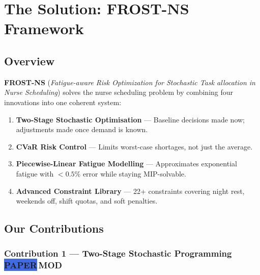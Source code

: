\documentclass[12pt,a4paper]{article}
\newcommand{\modbadge}{\colorbox{accentorange}{\tiny\color{white}\textbf{MOD}}\,}
\newcommand{\frombadge}{\colorbox{royalblue}{\tiny\color{white}\textbf{PAPER}}\,}
\begin{document}
\section{The Solution: FROST-NS Framework}

\subsection{Overview}

\begin{solutionbox}
\textbf{FROST-NS} (\textit{Fatigue-aware Risk Optimization for Stochastic Task allocation in Nurse Scheduling}) solves the nurse scheduling problem by combining four innovations into one coherent system:

\begin{enumerate}[itemsep=4pt]
  \item \textbf{Two-Stage Stochastic Optimisation} — Baseline decisions made now; adjustments made once demand is known.
  \item \textbf{CVaR Risk Control} — Limits worst-case shortages, not just the average.
  \item \textbf{Piecewise-Linear Fatigue Modelling} — Approximates exponential fatigue with \(<0.5\%\) error while staying MIP-solvable.
  \item \textbf{Advanced Constraint Library} — 22+ constraints covering night rest, weekends off, shift quotas, and soft penalties.
\end{enumerate}
\end{solutionbox}

\subsection{Our Contributions}

\subsubsection{Contribution 1 — Two-Stage Stochastic Programming \frombadge\modbadge}
\end{document}
